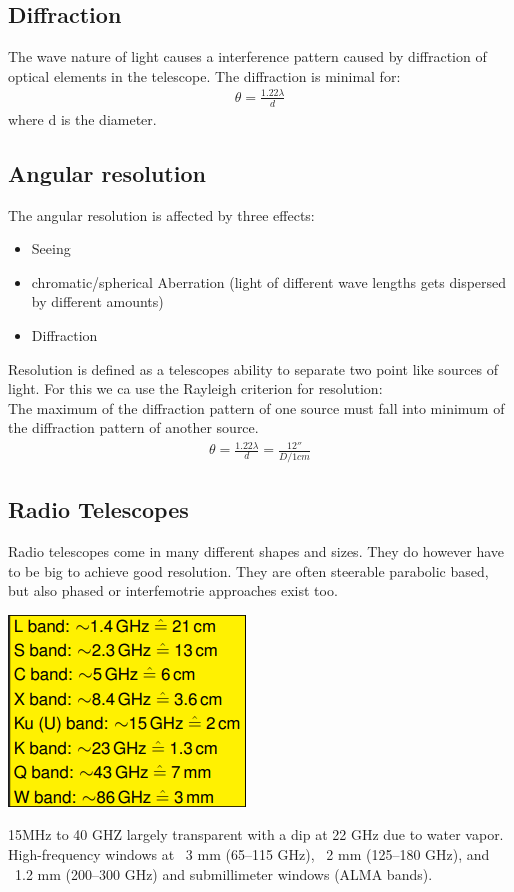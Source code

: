 \documentclass[11pt,a4paper]{article}
\begin{document}
\subsection{Diffraction}
The wave nature of light causes a interference pattern caused by diffraction of optical elements in the telescope.
The diffraction is minimal for:
\begin{align*}
    \theta = \frac{1.22 \lambda}{d} 
\end{align*}
where d is the diameter.
\subsection{Angular resolution}
The angular resolution is affected by three effects: 
\begin{itemize}
    \item Seeing 
    \item chromatic/spherical Aberration (light of different wave lengths gets dispersed by different amounts)
    \item Diffraction 
\end{itemize}
Resolution is defined as a telescopes ability to separate two point like sources of light.
For this we ca use the Rayleigh criterion for resolution: \\
The maximum of the diffraction pattern of one source must fall
into minimum of the diffraction pattern of another source.
\begin{align*}
    \theta = \frac{1.22 \lambda}{d}  = \frac {12''}{D/1cm}
\end{align*}
\subsection{Radio Telescopes}
Radio telescopes come in many different shapes and sizes.
They do however have to be big to achieve good resolution.
They are often steerable parabolic based, but also phased or interfemotrie approaches exist too.
\begin{center}
    \includegraphics[width=0.6\linewidth]{screenshot_2024-01-13-195458.png}
\end{center}
15MHz to 40 GHZ largely transparent with a dip at 22 GHz due to water vapor.
High-frequency windows at ~3 mm (65–115 GHz), ~2 mm (125–180 GHz), and
~1.2 mm (200–300 GHz) and submillimeter windows (ALMA bands).
\end{document}
